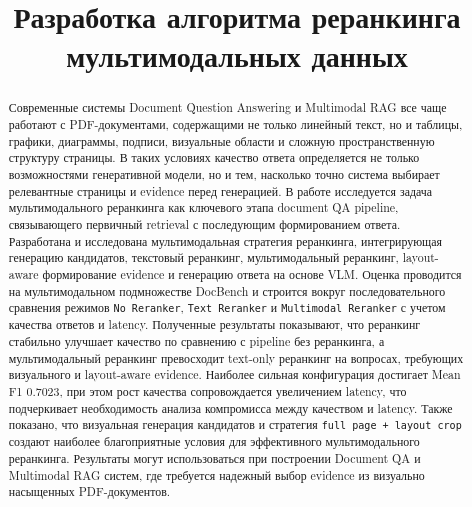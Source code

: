 \documentclass[conference]{IEEEtran}
\begin{document}
\title{Разработка алгоритма реранкинга мультимодальных данных}

\author{
}

\maketitle

\begin{abstract}
Современные системы Document Question Answering и Multimodal RAG все чаще работают с PDF-документами, содержащими не только линейный текст, но и таблицы, графики, диаграммы, подписи, визуальные области и сложную пространственную структуру страницы. В таких условиях качество ответа определяется не только возможностями генеративной модели, но и тем, насколько точно система выбирает релевантные страницы и evidence перед генерацией. В работе исследуется задача мультимодального реранкинга как ключевого этапа document QA pipeline, связывающего первичный retrieval с последующим формированием ответа. Разработана и исследована мультимодальная стратегия реранкинга, интегрирующая генерацию кандидатов, текстовый реранкинг, мультимодальный реранкинг, layout-aware формирование evidence и генерацию ответа на основе VLM. Оценка проводится на мультимодальном подмножестве DocBench и строится вокруг последовательного сравнения режимов \texttt{No Reranker}, \texttt{Text Reranker} и \texttt{Multimodal Reranker} с учетом качества ответов и latency. Полученные результаты показывают, что реранкинг стабильно улучшает качество по сравнению с pipeline без реранкинга, а мультимодальный реранкинг превосходит text-only реранкинг на вопросах, требующих визуального и layout-aware evidence. Наиболее сильная конфигурация достигает Mean F1 0.7023, при этом рост качества сопровождается увеличением latency, что подчеркивает необходимость анализа компромисса между качеством и latency. Также показано, что визуальная генерация кандидатов и стратегия \texttt{full page + layout crop} создают наиболее благоприятные условия для эффективного мультимодального реранкинга. Результаты могут использоваться при построении Document QA и Multimodal RAG систем, где требуется надежный выбор evidence из визуально насыщенных PDF-документов.
\end{abstract}
\end{document}
